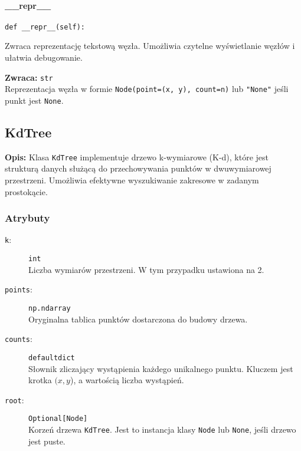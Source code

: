 \documentclass[12pt]{article}
\begin{document}
\paragraph{\_\_repr\_\_}

\begin{verbatim}
def __repr__(self):
\end{verbatim}

\noindent Zwraca reprezentację tekstową węzła. Umożliwia czytelne wyświetlanie węzłów i ułatwia debugowanie.

\textbf{Zwraca:} 
\texttt{str} \\
Reprezentacja węzła w formie \texttt{Node(point=(x, y), count=n)} lub \texttt{"None"} jeśli punkt jest \texttt{None}.

\subsection{KdTree}

\textbf{Opis:} Klasa \texttt{KdTree} implementuje drzewo k-wymiarowe (K-d), które jest strukturą danych służącą do przechowywania punktów w dwuwymiarowej przestrzeni. Umożliwia efektywne wyszukiwanie zakresowe w zadanym prostokącie.

\subsubsection{Atrybuty}

\begin{description}
    \item[\texttt{k}:] \texttt{int} \\
    Liczba wymiarów przestrzeni. W tym przypadku ustawiona na 2.
    
    \item[\texttt{points}:] \texttt{np.ndarray} \\
    Oryginalna tablica punktów dostarczona do budowy drzewa.
    
    \item[\texttt{counts}:] \texttt{defaultdict} \\
    Słownik zliczający wystąpienia każdego unikalnego punktu. Kluczem jest krotka \((x, y\)), a wartością liczba wystąpień.
    
    \item[\texttt{root}:] \texttt{Optional[Node]} \\
    Korzeń drzewa \texttt{KdTree}. Jest to instancja klasy \texttt{Node} lub \texttt{None}, jeśli drzewo jest puste.
\end{description}
\end{document}
